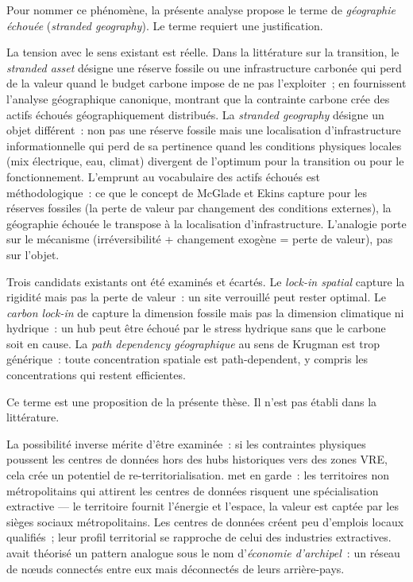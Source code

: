 Pour nommer ce phénomène, la présente analyse propose le terme de \emph{géographie échouée} (\emph{stranded geography}). Le terme requiert une justification.

La tension avec le sens existant est réelle. Dans la littérature sur la transition, le \emph{stranded asset} désigne une réserve fossile ou une infrastructure carbonée qui perd de la valeur quand le budget carbone impose de ne pas l'exploiter~; \textcite{mcglade_geographical_2015} en fournissent l'analyse géographique canonique, montrant que la contrainte carbone crée des actifs échoués géographiquement distribués. La \emph{stranded geography} désigne un objet différent~: non pas une réserve fossile mais une localisation d'infrastructure informationnelle qui perd de sa pertinence quand les conditions physiques locales (mix électrique, eau, climat) divergent de l'optimum pour la transition ou pour le fonctionnement. L'emprunt au vocabulaire des actifs échoués est méthodologique~: ce que le concept de McGlade et Ekins capture pour les réserves fossiles (la perte de valeur par changement des conditions externes), la géographie échouée le transpose à la localisation d'infrastructure. L'analogie porte sur le mécanisme (irréversibilité + changement exogène = perte de valeur), pas sur l'objet.

Trois candidats existants ont été examinés et écartés. Le \emph{lock-in spatial} capture la rigidité mais pas la perte de valeur~: un site verrouillé peut rester optimal. Le \emph{carbon lock-in} de \textcite{unruh_understanding_2000} capture la dimension fossile mais pas la dimension climatique ni hydrique~: un hub peut être échoué par le stress hydrique sans que le carbone soit en cause. La \emph{path dependency géographique} au sens de Krugman est trop générique~: toute concentration spatiale est path-dependent, y compris les concentrations qui restent efficientes.

Ce terme est une proposition de la présente thèse. Il n'est pas établi dans la littérature.

La possibilité inverse mérite d'être examinée~: si les contraintes physiques poussent les centres de données hors des hubs historiques vers des zones VRE, cela crée un potentiel de re-territorialisation. \textcite{rodriguez_pose_revenge_2018} met en garde~: les territoires non métropolitains qui attirent les centres de données risquent une spécialisation extractive --- le territoire fournit l'énergie et l'espace, la valeur est captée par les sièges sociaux métropolitains. Les centres de données créent peu d'emplois locaux qualifiés~; leur profil territorial se rapproche de celui des industries extractives. \textcite{veltz_mondialisation_1996} avait théorisé un pattern analogue sous le nom d'\emph{économie d'archipel}~: un réseau de nœuds connectés entre eux mais déconnectés de leurs arrière-pays.

